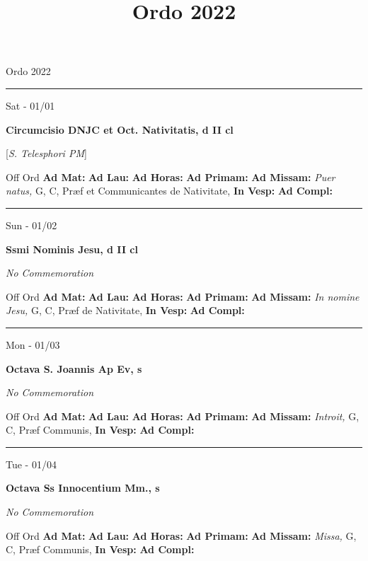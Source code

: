 \documentclass[letterpaper, 10pt]{article}
\title{Ordo 2022}
\begin{document}
\begin{center}
\Huge Ordo 2022\end{center}

\hrule
\begin{center}
Sat - 01/01
\end{center}\textbf{ \large Circumcisio DNJC et Oct. Nativitatis, \textnormal{\normalsize d II cl}}

[\textit{S. Telesphori PM}]
\begin{justify}
Off Ord
\textbf{Ad Mat: }
\textbf{Ad Lau: }
\textbf{Ad Horas: }
\textbf{Ad Primam: }
\textbf{Ad Missam:} \textit{Puer natus, } G, C, Præf et Communicantes de Nativitate, 
\textbf{In Vesp: }
\textbf{Ad Compl: }\end{justify}



\hrule
\begin{center}
Sun - 01/02
\end{center}\textbf{ \large Ssmi Nominis Jesu, \textnormal{\normalsize d II cl}}

\textit{No Commemoration}\begin{justify}
Off Ord
\textbf{Ad Mat: }
\textbf{Ad Lau: }
\textbf{Ad Horas: }
\textbf{Ad Primam: }
\textbf{Ad Missam:} \textit{In nomine Jesu, } G, C, Præf de Nativitate, 
\textbf{In Vesp: }
\textbf{Ad Compl: }\end{justify}



\hrule
\begin{center}
Mon - 01/03
\end{center}\textbf{ \large Octava S. Joannis Ap Ev, \textnormal{\normalsize s}}

\textit{No Commemoration}\begin{justify}
Off Ord
\textbf{Ad Mat: }
\textbf{Ad Lau: }
\textbf{Ad Horas: }
\textbf{Ad Primam: }
\textbf{Ad Missam:} \textit{Introit, } G, C, Præf Communis, 
\textbf{In Vesp: }
\textbf{Ad Compl: }\end{justify}



\hrule
\begin{center}
Tue - 01/04
\end{center}\textbf{ \large Octava Ss Innocentium Mm., \textnormal{\normalsize s}}

\textit{No Commemoration}\begin{justify}
Off Ord
\textbf{Ad Mat: }
\textbf{Ad Lau: }
\textbf{Ad Horas: }
\textbf{Ad Primam: }
\textbf{Ad Missam:} \textit{Missa, } G, C, Præf Communis, 
\textbf{In Vesp: }
\textbf{Ad Compl: }\end{justify}
\end{document}
